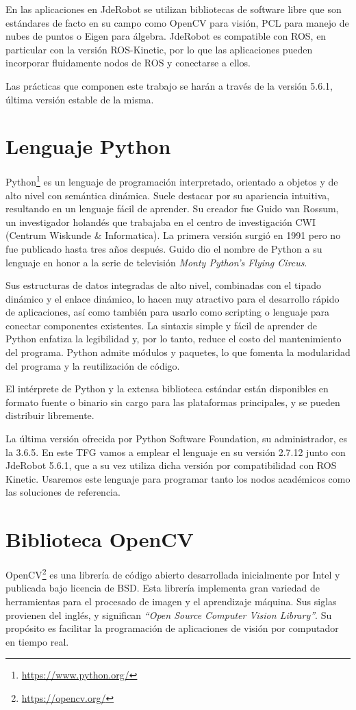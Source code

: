 En las aplicaciones en JdeRobot se utilizan bibliotecas de software libre que son estándares de facto en su campo como OpenCV para visión, PCL para manejo de nubes de puntos o Eigen para álgebra. JdeRobot es compatible con ROS, en particular con la versión ROS-Kinetic, por lo que las aplicaciones pueden incorporar fluidamente nodos de ROS y conectarse a ellos.

Las prácticas que componen este trabajo se harán a través de la versión 5.6.1, última versión estable de la misma.

\section{Lenguaje Python}
Python\footnote{\url{https://www.python.org/}} es un lenguaje de programación interpretado, orientado a objetos y de alto nivel con semántica dinámica. Suele destacar por su apariencia intuitiva, resultando en un lenguaje fácil de aprender. Su creador fue Guido van Rossum, un investigador holandés que trabajaba en el centro de investigación CWI (Centrum Wiskunde \& Informatica). La primera versión surgió en 1991 pero no fue publicado hasta tres años después. Guido dio el nombre de Python a su lenguaje en honor a la serie de televisión \textit{Monty Python’s Flying Circus}.

Sus estructuras de datos integradas de alto nivel, combinadas con el tipado dinámico y el enlace dinámico, lo hacen muy atractivo para el desarrollo rápido de aplicaciones, así como también para usarlo como scripting o lenguaje para conectar componentes existentes. La sintaxis simple y fácil de aprender de Python enfatiza la legibilidad y, por lo tanto, reduce el costo del mantenimiento del programa. Python admite módulos y paquetes, lo que fomenta la modularidad del programa y la reutilización de código. 

El intérprete de Python y la extensa biblioteca estándar están disponibles en formato fuente o binario sin cargo para las plataformas principales, y se pueden distribuir libremente.

La última versión ofrecida por Python Software Foundation, su administrador, es la 3.6.5. En este TFG vamos a emplear el lenguaje en su versión 2.7.12 junto con JdeRobot 5.6.1, que a su vez utiliza dicha versión por compatibilidad con ROS Kinetic. Usaremos este lenguaje para programar tanto los nodos académicos como las soluciones de referencia.

\section{Biblioteca OpenCV}
OpenCV\footnote{\url{https://opencv.org/}} es una librería de código abierto desarrollada inicialmente por Intel y publicada bajo licencia de BSD. Esta librería implementa gran variedad de herramientas para el procesado de imagen y el aprendizaje máquina. Sus siglas provienen del inglés, y significan \textit{“Open Source Computer Vision Library”}. Su propósito es facilitar la programación de aplicaciones de visión por computador en tiempo real.


